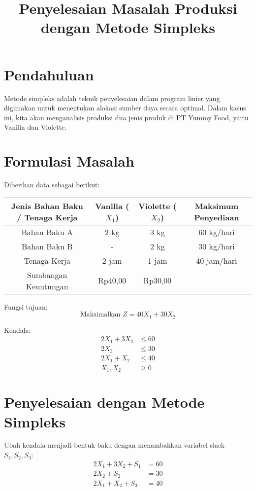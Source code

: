 \documentclass[12pt,a4paper]{article}
\title{Penyelesaian Masalah Produksi dengan Metode Simpleks}
\author{}
\date{}
\begin{document}
\maketitle

\section*{Pendahuluan}
Metode simpleks adalah teknik penyelesaian dalam program linier yang digunakan untuk menentukan alokasi sumber daya secara optimal. Dalam kasus ini, kita akan menganalisis produksi dua jenis produk di PT Yummy Food, yaitu Vanilla dan Violette.

\section*{Formulasi Masalah}
Diberikan data sebagai berikut:
\begin{center}
\begin{tabular}{|c|c|c|c|}
\hline
Jenis Bahan Baku / Tenaga Kerja & Vanilla ($X_1$) & Violette ($X_2$) & Maksimum Penyediaan \\
\hline
Bahan Baku A & 2 kg & 3 kg & 60 kg/hari \\
Bahan Baku B & - & 2 kg & 30 kg/hari \\
Tenaga Kerja & 2 jam & 1 jam & 40 jam/hari \\
Sumbangan Keuntungan & Rp40,00 & Rp30,00 & \\
\hline
\end{tabular}
\end{center}

Fungsi tujuan: 
\[
\text{Maksimalkan } Z = 40X_1 + 30X_2
\]

Kendala:
\[
\begin{aligned}
2X_1 + 3X_2 &\leq 60 \\
2X_2 &\leq 30 \\
2X_1 + X_2 &\leq 40 \\
X_1, X_2 &\geq 0
\end{aligned}
\]

\section*{Penyelesaian dengan Metode Simpleks}

Ubah kendala menjadi bentuk baku dengan menambahkan variabel slack $S_1, S_2, S_3$:
\[
\begin{aligned}
2X_1 + 3X_2 + S_1 &= 60 \\
2X_2 + S_2 &= 30 \\
2X_1 + X_2 + S_3 &= 40 \\
\end{aligned}
\]
\end{document}
